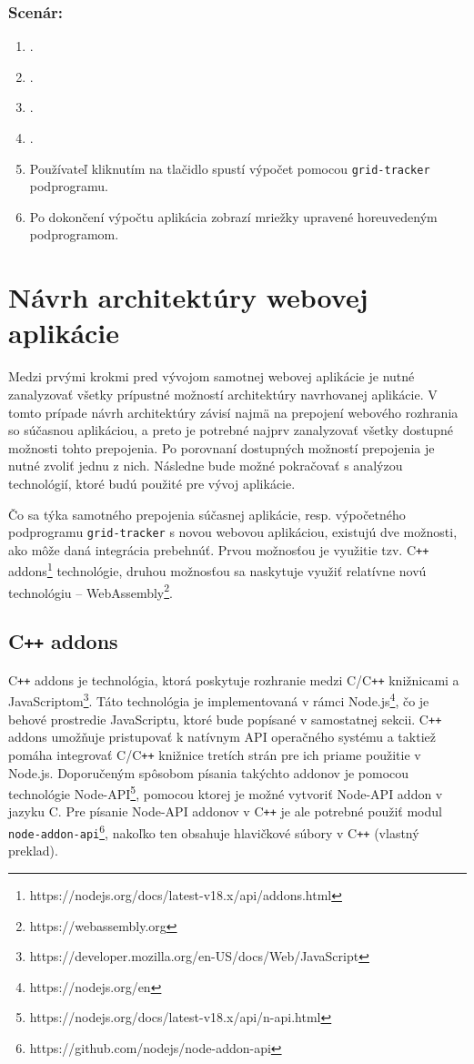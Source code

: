 \subsubsection*{Scenár:}
\begin {enumerate}
\item {}.
\item {}.
\item {}.
\item {}.
\item {Používateľ kliknutím na tlačidlo  spustí výpočet pomocou \texttt{grid-tracker} podprogramu.}
\item {Po dokončení výpočtu aplikácia zobrazí mriežky upravené horeuvedeným podprogramom.}
\end {enumerate}

\section {Návrh architektúry webovej aplikácie}
Medzi prvými krokmi pred vývojom samotnej webovej aplikácie je nutné zanalyzovať všetky prípustné možností architektúry navrhovanej aplikácie. V tomto prípade návrh architektúry závisí najmä na prepojení webového rozhrania so súčasnou aplikáciou, a preto je potrebné najprv zanalyzovať všetky dostupné možnosti tohto prepojenia. Po porovnaní dostupných možností prepojenia je nutné zvoliť jednu z nich. Následne bude možné pokračovať s analýzou technológií, ktoré budú použité pre vývoj aplikácie.

Čo sa týka samotného prepojenia súčasnej aplikácie, resp. výpočetného podprogramu \texttt{grid-tracker} s novou webovou aplikáciou, existujú dve možnosti, ako môže daná integrácia prebehnúť. Prvou možnosťou je využitie tzv. C\texttt{++} addons\footnote{https://nodejs.org/docs/latest-v18.x/api/addons.html} technológie, druhou možnosťou sa naskytuje využiť relatívne novú technológiu -- WebAssembly\footnote{https://webassembly.org}.

\subsection {C\texttt{++} addons}
C\texttt{++} addons je technológia, ktorá poskytuje rozhranie medzi C/C\texttt{++} knižnicami a JavaScriptom\footnote{https://developer.mozilla.org/en-US/docs/Web/JavaScript}. Táto technológia je implementovaná v rámci Node.js\footnote{https://nodejs.org/en}, čo je behové prostredie JavaScriptu, ktoré bude popísané v samostatnej sekcii.
C\texttt{++} addons umožňuje pristupovať k natívnym API operačného systému a taktiež pomáha integrovať C/C\texttt{++} knižnice tretích strán pre ich priame použitie v Node.js. Doporučeným spôsobom písania takýchto addonov je pomocou technológie Node-API\footnote{https://nodejs.org/docs/latest-v18.x/api/n-api.html}, pomocou ktorej je možné vytvoriť Node-API addon v jazyku C. Pre písanie Node-API addonov v C\texttt{++} je ale potrebné použiť modul \texttt{node-addon-api}\footnote{https://github.com/nodejs/node-addon-api}, nakoľko ten obsahuje hlavičkové súbory v C\texttt{++} \cite{cpp_addons} (vlastný preklad).

